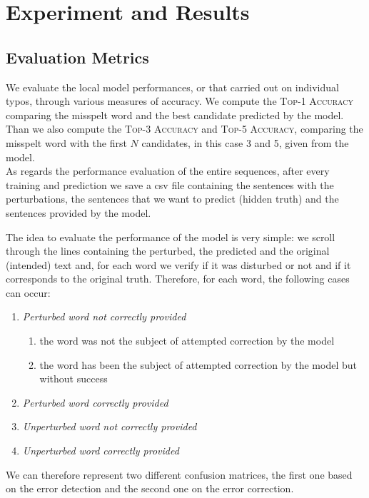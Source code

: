 \chapter{Experiment and Results}

\section{Evaluation Metrics}
We evaluate the local model performances, or that carried out on individual typos, through various measures of 
accuracy. 
We compute the \textsc{Top-1 Accuracy} comparing the misspelt word and the best candidate predicted by the 
model. 
Than we also compute the \textsc{Top-3 Accuracy} and \textsc{Top-5 Accuracy}, comparing the misspelt word 
with the first $N$ candidates, in this case \num{3} and \num{5}, given from the model.\\


As regards the performance evaluation of the entire sequences, after every training and prediction we save a csv 
file containing the sentences with the perturbations, the sentences that we want to predict (hidden truth) and the 
sentences provided by the model.

The idea to evaluate the performance of the model is very simple: we scroll through the lines containing the 
perturbed, the predicted and the original (intended) text and, for each word we verify if it was disturbed or not and 
if it corresponds to the original truth.
Therefore, for each word, the following cases can occur:
\begin{enumerate}
	\item \textit{Perturbed word not correctly provided}
	\begin{enumerate}
		\item the word was not the subject of attempted correction by the model
		\item the word has been the subject of attempted correction by the model but without success
	\end{enumerate}
	\item \textit{Perturbed word correctly provided}
	\item \textit{Unperturbed word not correctly provided}
	\item \textit{Unperturbed word correctly provided}
\end{enumerate}

We can therefore represent two different confusion matrices, the first one based on the error detection and the 
second one on the error correction.


